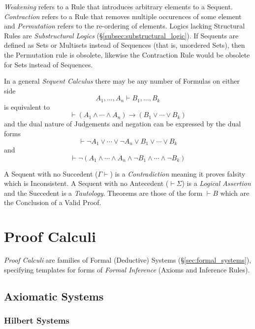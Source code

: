 \documentclass{article}
\begin{document}
\emph{Weakening} refers to a Rule that introduces arbitrary elements
to a Sequent. \emph{Contraction} refers to a Rule that removes
multiple occurences of some element and \emph{Permutation} refers to
the re-ordering of elements. Logics lacking Structural Rules are
\emph{Substructural Logics} (\S\ref{subsec:substructural_logic}). If
Sequents are defined as Sets or Multisets instead of Sequences (that
is, unordered Sets), then the Permutation rule is obsolete, likewise
the Contraction Rule would be obsolete for Sets instead of Sequences.

In a general \emph{Sequent Calculus} there may be any
number of Formulas on either side
\[
    A_1, \ldots, A_n \vdash B_1, \ldots, B_k
\]
is equivalent to
\[
    \vdash(A_1 \wedge \cdots \wedge A_n) \rightarrow (B_1 \vee \cdots \vee B_k)
\]
and the dual nature of Judgements and negation can be expressed by the
dual forms
\[
    \vdash \neg A_1 \vee \cdots \vee \neg A_n \vee B_1 \vee \cdots
    \vee B_k
\]
and
\[
    \vdash \neg(A_1 \wedge \cdots \wedge A_n \wedge \neg B_1 \wedge
    \cdots \wedge \neg B_k)
\]

A Sequent with no Succedent ($\Gamma \vdash$) is a
\emph{Contradiction} meaning it proves falsity which is
Inconsistent. A Sequent with no Antecedent ($\vdash \Sigma$) is a
\emph{Logical Assertion} and the Succedent is a
\emph{Tautology}. Theorems are those of the form $\vdash B$ which are
the Conclusion of a Valid Proof.

\section{Proof Calculi}

\emph{Proof Calculi} are families of Formal (Deductive) Systems
(\S\ref{sec:formal_systems}), specifying templates for forms of
\emph{Formal Inference} (Axioms and Inference Rules).

\subsection{Axiomatic Systems}

\subsubsection{Hilbert Systems} \label{subsec:hilbert_systems}
\end{document}
